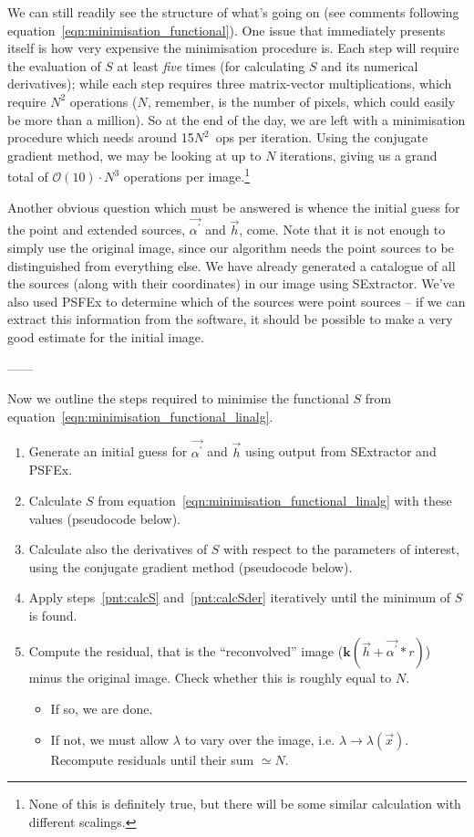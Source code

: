 \documentclass[letterpaper, 11pt]{article}
\def\ra{\ensuremath{\rightarrow}\xspace}
\begin{document}
We can still readily see the structure of what's going on (see comments following equation~\ref{eqn:minimisation_functional}). One issue that immediately presents itself is how very expensive the minimisation procedure is. Each step will require the evaluation of $S$ at least \emph{five} times (for calculating $S$ and its numerical derivatives); while each step requires three matrix-vector multiplications, which require $N^2$ operations ($N$, remember, is the number of pixels, which could easily be more than a million). So at the end of the day, we are left with a minimisation procedure which needs around 15$N^2$~ops per iteration. Using the conjugate gradient method, we may be looking at up to $N$ iterations, giving us a grand total of $\mathcal{O}(10)\cdot N^3$ operations per image.\footnote{None of this is definitely true, but there will be some similar calculation with different scalings.}

Another obvious question which must be answered is whence the initial guess for the point and extended sources, $\vec{\alpha^\prime}$ and $\vec{h}$, come. Note that it is not enough to simply use the original image, since our algorithm needs the point sources to be distinguished from everything else. We have already generated a catalogue of all the sources (along with their coordinates) in our image using SExtractor.  We've also used PSFEx to determine which of the sources were point sources -- if we can extract this information from the software, it should be possible to make a very good estimate for the initial image.

------

Now we outline the steps required to minimise the functional $S$ from equation~\ref{eqn:minimisation_functional_linalg}.

\begin{enumerate}
	\item Generate an initial guess for $\vec{\alpha^\prime}$ and $\vec{h}$ using output from SExtractor and PSFEx.
	\item Calculate $S$ from equation~\ref{eqn:minimisation_functional_linalg} with these values (pseudocode below).\label{pnt:calcS}
	\item Calculate also the derivatives of $S$ with respect to the parameters of interest, using the conjugate gradient method (pseudocode below).\label{pnt:calcSder}
	\item Apply steps~\ref{pnt:calcS} and~\ref{pnt:calcSder} iteratively until the minimum of $S$ is found.
	\item Compute the residual, that is the ``reconvolved'' image ($\mathbf k\left(\vec{h}+\vec{\alpha^\prime}\ast r\right)$) minus the original image. Check whether this is roughly equal to $N$.
	\begin{itemize}
		\item If so, we are done.
		\item If not, we must allow $\lambda$ to vary over the image, i.e. $\lambda\ra\lambda(\vec x)$. Recompute residuals until their sum $\simeq N$.
	\end{itemize}
\end{enumerate}
\end{document}

